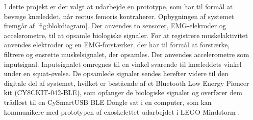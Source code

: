 \noindent
I dette projekt er der valgt at udarbejde en prototype, som har til formål at bevæge knæleddet, når rectus femoris kontraherer. Opbygningen af systemet fremgår af \autoref{fig:blokdiagram}. Der anvendes to sensorer, EMG-elekroder og accelerometre, til at opsamle biologiske signaler. 
For at registrere muskelaktivitet anvendes elektroder og en EMG-forstærker, der har til formål at forstærke, filtrere og ensrette muskelsignalet, der opsamles. 
Der anvendes accelerometre som inputsignal. Inputsignalet omregnes til en vinkel svarende til knæleddets vinkel under en squat-øvelse. 
De opsamlede signaler sendes herefter videre til den digitale del af systemet, hvilket er bestående af et Bluetooth Low Energy Pioneer kit (CY8CKIT-042-BLE), som opfanger de biologiske signaler og overfører dem trådløst til en CySmartUSB BLE Dongle sat i en computer, som kan kommunikere med prototypen af exoskelettet udarbejdet i LEGO Mindstorm . 

